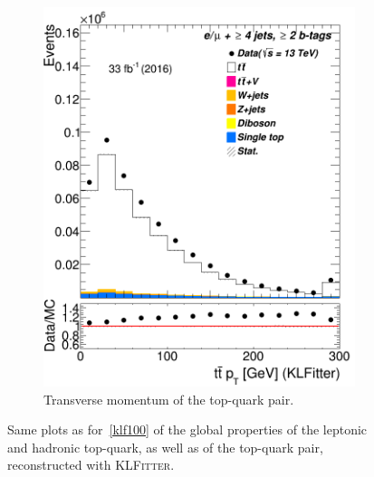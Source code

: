 \begin{figure}
\begin{subfigure}{0.25\textwidth}
		\includegraphics[width=\linewidth]{ControlPlots_emujets_2016_4incl_2incl/klf_ttbar_pt_emujets_2016.png}
		\caption{Transverse momentum of the top-quark pair.} \label{fig:K20}
	\end{subfigure}
	
	\caption{Same plots as for~\cref{klf100} of the  global properties of the leptonic and hadronic top-quark, as well as of the top-quark pair, reconstructed with \textsc{KLFitter}.  }
\end{figure}	




